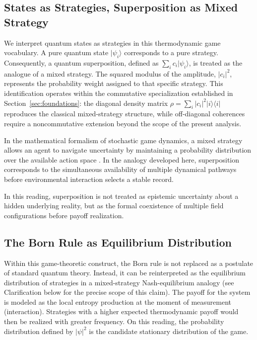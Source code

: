 \documentclass[12pt,a4paper]{article}
\theoremstyle{remark}
\begin{document}
\subsection{States as Strategies, Superposition as Mixed Strategy}

We interpret quantum states as strategies in this thermodynamic game vocabulary. A pure quantum state $|\psi_i\rangle$ corresponds to a pure strategy. Consequently, a quantum superposition, defined as $\sum_i c_i |\psi_i\rangle$, is treated as the analogue of a mixed strategy. The squared modulus of the amplitude, $|c_i|^2$, represents the probability weight assigned to that specific strategy. This identification operates within the commutative specialization established in Section~\ref{sec:foundations}: the diagonal density matrix $\rho = \sum_i |c_i|^2 |i\rangle\langle i|$ reproduces the classical mixed-strategy structure, while off-diagonal coherences require a noncommutative extension beyond the scope of the present analysis.

In the mathematical formalism of stochastic game dynamics, a mixed strategy allows an agent to navigate uncertainty by maintaining a probability distribution over the available action space \citep{BusemeyerBruza2012}. In the analogy developed here, superposition corresponds to the simultaneous availability of multiple dynamical pathways before environmental interaction selects a stable record.

In this reading, superposition is not treated as epistemic uncertainty about a hidden underlying reality, but as the formal coexistence of multiple field configurations before payoff realization.

\subsection{The Born Rule as Equilibrium Distribution}

Within this game-theoretic construct, the Born rule is not replaced as a postulate of standard quantum theory. Instead, it can be reinterpreted as the equilibrium distribution of strategies in a mixed-strategy Nash-equilibrium analogy (see Clarification below for the precise scope of this claim). The payoff for the system is modeled as the local entropy production at the moment of measurement (interaction). Strategies with a higher expected thermodynamic payoff would then be realized with greater frequency. On this reading, the probability distribution defined by $|\psi|^2$ is the candidate stationary distribution of the game.
\end{document}
